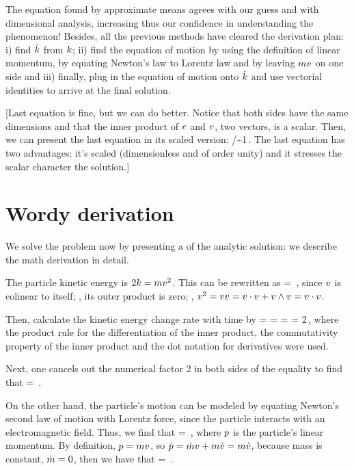 The equation found by approximate means agrees with our guess and with dimensional analysis, increasing thus our confidence in understanding the phenomenon! Besides, all the previous methods have cleared the derivation plan: i) find $\dot{k}$ from $k$; ii) find the equation of motion by using the definition of linear momentum, by equating Newton's law to Lorentz law and by leaving $mv$ on one side and iii) finally, plug in the equation of motion onto $\dot{k}$ and use vectorial identities to arrive at the final solution.

[Last equation is fine, but we can do better. Notice that both sides have the same dimensions and that the inner product of $e$ and $v$, two vectors, is a scalar. Then, we can present the last equation in its scaled version:
%
\beq
  \dt\ekin/\echarge\efield\iprod\vel\sim 1\,.
\eeq
%
The last equation has two advantages: it's scaled (dimensionless and of order unity) and it stresses the scalar character the solution.]


\section{Wordy derivation}
% 
We solve the problem now by presenting a  of the analytic solution: we describe the math derivation in detail.

The particle kinetic energy is $2k = mv^2$. This can be rewritten as
%
\ekin = \mass\vel\iprod\vel\,,
\eeq
%
since $v$ is colinear to itself; \ie, its outer product is zero; \viz, $v^2 = vv = v\cdot v + v\wedge v = v\cdot v$. 

Then, calculate the kinetic energy change rate with time by
%
\ekin = \mass\vel\iprod\vel {}\dt\ekin = \mass\parth{\dt\vel\iprod\vel + \vel\iprod\dt\vel} 
            = \mass\parth{\dt\vel\iprod\vel + \dt\vel\iprod\vel}
            = 2\mass\dt\vel\iprod\vel\,,
\eeq
%
where the product rule for the differentiation of the inner product, the commutativity property of the inner product and the dot notation for derivatives were used.

Next, one cancels out the numerical factor 2 in both sides of the equality to find that
%
\beq
  \ekin = \mass\dt\vel\iprod\vel\,.
\eeq

On the other hand, the particle's motion can be modeled by equating Newton's second law of motion with Lorentz force, since the particle interacts with an electromagnetic field. Thus, we find that
%
\beq
  \dt\mom = \echarge\parth{\efield + \vel\cprod\mfield}\,,
\eeq
%
where $p$ is the particle's linear momentum. By definition, $p = mv$, so $\dot{p} = \dot{m}v + m\dot{v} = m\dot{v}$, because mass is constant, $\dot{m} = 0$, then we have that
%
\beq
  \mass\dt\vel = \echarge\parth{\efield + \vel\cprod\mfield}\,.
\eeq

